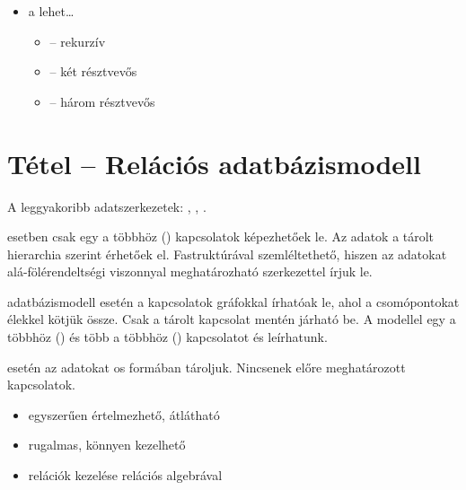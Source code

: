 \documentclass[main.tex]{subfiles}
\begin{document}
\begin{itemize}
    \item a  lehet\dots
    \begin{itemize}
      \item {} \tabto{2cm} – \tabto{2.5cm} rekurzív
      
      \item {} \tabto{2cm} – \tabto{2.5cm} két résztvevős

      \item {} \tabto{2cm} – \tabto{2.5cm} három résztvevős
    \end{itemize}
  \end{itemize}

  



  \section{Tétel – Relációs adatbázismodell} %

  A leggyakoribb adatszerkezetek:
  ,
  ,
  .

  \vspace{.5em}
   esetben csak egy a többhöz
  () kapcsolatok képezhetőek le.
  Az adatok a tárolt hierarchia szerint érhetőek el.
  Fastruktúrával szemléltethető,
  hiszen az adatokat alá-fölérendeltségi
  viszonnyal meghatározható szerkezettel írjuk le.

  \vspace{.5em}
   adatbázismodell esetén a kapcsolatok
  gráfokkal írhatóak le, ahol a csomópontokat élekkel
  kötjük össze. Csak a tárolt kapcsolat mentén járható be.
  A modellel egy a többhöz () és több a többhöz 
  () kapcsolatot és leírhatunk.

  
   esetén az adatokat os
  formában tároljuk. Nincsenek előre meghatározott kapcsolatok.
  \begin{itemize}
    \item egyszerűen értelmezhető, átlátható
    
    \item rugalmas, könnyen kezelhető
    
    \item relációk kezelése relációs algebrával
  \end{itemize}
  
\end{document}
